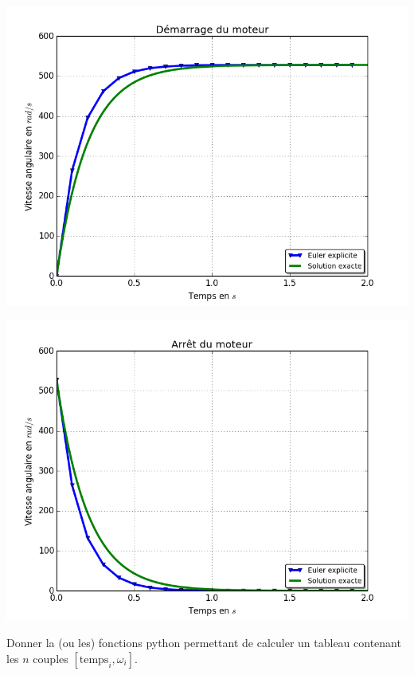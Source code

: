 \documentclass[10pt]{article}
\begin{document}
\begin{minipage}[c]{.47\linewidth}
\begin{center}
\includegraphics[width=.95\textwidth]{images/fig_04_bis}
\end{center}
\end{minipage}
\hfill
\begin{minipage}[c]{.47\linewidth}
\begin{center}
\includegraphics[width=.95\textwidth]{images/fig_05_bis}
\end{center}
\end{minipage}

\begin{exemple}
Donner la (ou les) fonctions python permettant de calculer un tableau contenant les $n$ couples $[\text{temps}_i,\omega_i]$. 
\vspace{10cm}
\end{exemple}
\end{document}
